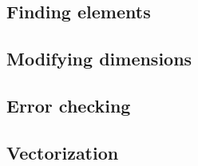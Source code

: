 
\subsection{Finding elements \label{SEC:support:generic:find}}


\subsection{Modifying dimensions \label{SEC:support:generic:dims}}


\subsection{Error checking \label{SEC:support:generic:error}}


\subsection{Vectorization \label{SEC:support:generic:vectorization}}

